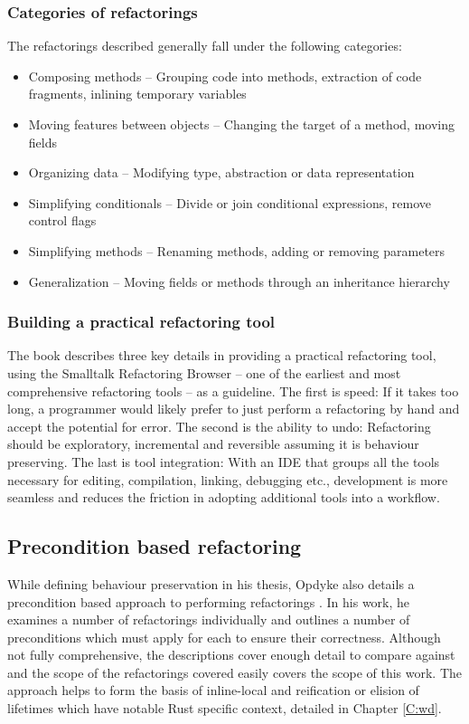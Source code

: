 \subsubsection{Categories of refactorings}
The refactorings described generally fall under the following categories:
\begin{itemize}
\item Composing methods -- Grouping code into methods, extraction of code fragments, inlining temporary variables
\item Moving features between objects -- Changing the target of a method, moving fields
\item Organizing data -- Modifying type, abstraction or data representation
\item Simplifying conditionals -- Divide or join conditional expressions, remove control flags
\item Simplifying methods -- Renaming methods, adding or removing parameters
\item Generalization -- Moving fields or methods through an inheritance hierarchy
\end{itemize}

\subsubsection{Building a practical refactoring tool}
The book describes three key details in providing a practical refactoring tool, using the Smalltalk Refactoring Browser -- one of the earliest and most comprehensive refactoring tools -- as a guideline. The first is speed: If it takes too long, a programmer would likely prefer to just perform a refactoring by hand and accept the potential for error. The second is the ability to undo: Refactoring should be exploratory, incremental and reversible assuming it is behaviour preserving. The last is tool integration: With an IDE that groups all the tools necessary for editing, compilation, linking, debugging etc., development is more seamless and reduces the friction in adopting additional tools into a workflow. 




\subsection{Precondition based refactoring}
While defining behaviour preservation in his thesis, Opdyke also details a precondition based approach to performing refactorings \cite{opdyke1992refactoring}. In his work, he examines a number of refactorings individually and outlines a number of preconditions which must apply for each to ensure their correctness. Although not fully comprehensive, the descriptions cover enough detail to compare against and the scope of the refactorings covered easily covers the scope of this work. The approach helps to form the basis of inline-local and reification or elision of lifetimes which have notable Rust specific context, detailed in Chapter \ref{C:wd}. 


